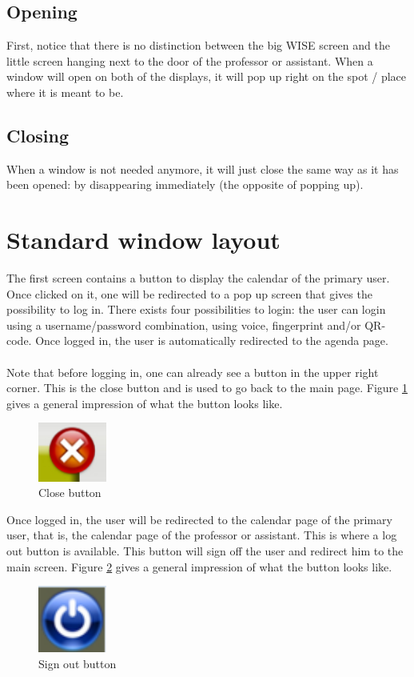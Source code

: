 \documentclass[11pt, a4paper,svglistings]{report}
\begin{document}
\subsection{Opening}

First, notice that there is no distinction between the big WISE screen and the little screen hanging next to the door of the professor or assistant. When a window will open on both of the displays, it will pop up right on the spot / place where it is meant to be. 

\subsection{Closing}

When a window is not needed anymore, it will just close the same way as it has been opened: by disappearing immediately (the opposite of popping up).

\section{Standard window layout}

The first screen contains a button to display the calendar of the primary user. Once clicked on it, one will be redirected to a pop up screen that gives the possibility to log in. There exists four possibilities to login: the user can login using a username/password combination, using voice, fingerprint and/or QR-code. Once logged in, the user is automatically redirected to the agenda page. \\ \\
Note that before logging in, one can already see a button in the upper right corner. This is the close button and is used to go back to the main page. Figure \ref{fig:CloseButton} gives a general impression of what the button looks like.
\begin{figure}[H]
\centering
    \includegraphics[width=0.2\textwidth]{CloseButton.png}
  \caption[Close Button]{\label{fig:CloseButton} Close button}
\end{figure}

Once logged in, the user will be redirected to the calendar page of the primary user, that is, the calendar page of the professor or assistant. This is where a log out button is available. This button will sign off the user and redirect him to the main screen. Figure \ref{fig:SignOutButton} gives a general impression of what the button looks like.
\begin{figure}[H]
\centering
    \includegraphics[width=0.2\textwidth]{SignOff.png}
  \caption[Sign out Button]{\label{fig:SignOutButton} Sign out button}
\end{figure}
\end{document}
